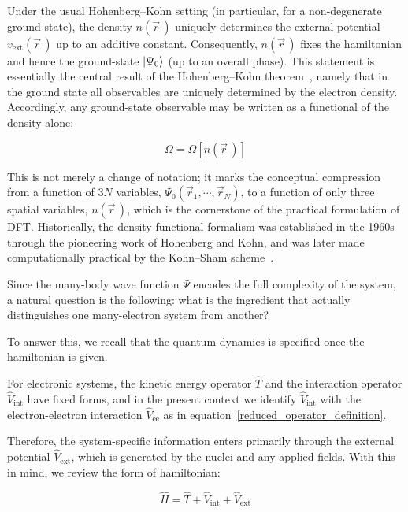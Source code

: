 Under the usual Hohenberg--Kohn setting (in particular, for a non-degenerate ground-state), the density $n(\vec{r}\,)$ uniquely determines the external potential $v_\mathrm{ext}(\vec{r}\,)$ up to an additive constant.
Consequently, $n(\vec{r}\,)$ fixes the hamiltonian and hence the ground-state $\ket{\Psi_0}$ (up to an overall phase).
This statement is essentially the central result of the Hohenberg--Kohn theorem~\cite{hohenberg1964inhomogeneous}, namely that in the ground state all observables are uniquely determined by the electron density.
Accordingly, any ground-state observable may be written as a functional of the density alone:

\begin{equation}
    \Omega = \Omega[n(\vec{r}\,)]
\label{ground_state_observable_density_functional}
\end{equation}

This is not merely a change of notation; it marks the conceptual compression from a function of $3N$ variables, $\Psi_0(\vec{r}_1,\cdots,\vec{r}_N)$, to a function of only three spatial variables, $n(\vec{r}\,)$, which is the cornerstone of the practical formulation of DFT.
Historically, the density functional formalism was established in the 1960s through the pioneering work of Hohenberg and Kohn, and was later made computationally practical by the Kohn--Sham scheme~\cite{kohn1965self}.

Since the many-body wave function $\Psi$ encodes the full complexity of the system, a natural question is the following: what is the ingredient that actually distinguishes one many-electron system from another?

To answer this, we recall that the quantum dynamics is specified once the hamiltonian is given.

For electronic systems, the kinetic energy operator $\hat{T}$ and the interaction operator $\hat{V}_\mathrm{int}$ have fixed forms, and in the present context we identify $\hat{V}_\mathrm{int}$ with the electron-electron interaction $\hat{V}_\mathrm{ee}$ as in equation~\eqref{reduced_operator_definition}.

Therefore, the system-specific information enters primarily through the external potential $\hat{V}_\mathrm{ext}$, which is generated by the nuclei and any applied fields.
With this in mind, we review the form of hamiltonian:

\begin{equation}
    \hat{H}=\hat{T}+\hat{V}_\mathrm{int}+\hat{V}_\mathrm{ext}
\label{hamiltonian_decomposition}
\end{equation}

